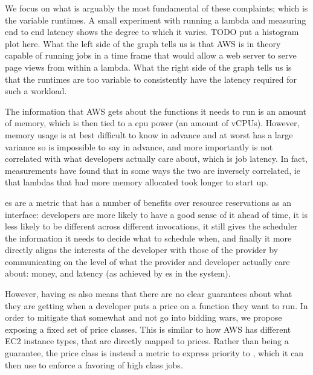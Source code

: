 We focus on what is arguably the most fundamental of these complaints; which is
the variable runtimes. A small experiment with running a lambda and measuring
end to end latency shows the degree to which it varies. TODO put a histogram
plot here. What the left side of
the graph tells us is that AWS is in theory capable of running jobs in a time
frame that would allow a web server to serve page views from within a lambda.
What the right side of the graph tells us is that the runtimes are too variable
to consistently have the latency required for such a workload.

The information that AWS gets about the functions it needs to run is an amount
of memory, which is then tied to a cpu power (an amount of vCPUs). However,
memory usage is at best difficult to know in advance and at worst has a large
variance so is impossible to say in advance, and more importantly is not
correlated with what developers actually care about, which is job latency. In
fact, measurements have found that in some ways the two are inversely
correlated, ie that lambdas that had more memory allocated took longer to start
up. 

\Priceclass{}es are a metric that has a number of benefits over resource
reservations as an interface: developers are more likely to have a good sense of
it ahead of time, it is less likely to be different across different
invocations, it still gives the scheduler the information it needs to decide
what to schedule when, and finally it more directly aligns the interests of the
developer with those of the provider by communicating on the level of what the
provider and developer actually care about: money, and latency (as achieved by
\class{}es in the system).


However, having \priceclass{}es also means that there are no clear guarantees
about what they are getting when a developer puts a price on a function they
want to run. In order to mitigate that somewhat and not go into bidding wars, we
propose exposing a fixed set of price classes. This is similar to how AWS has
different EC2 instance types, that are directly mapped to prices. Rather than
being a guarantee, the price class is instead a metric to express priority to
\sys{}, which it can then use to enforce a favoring of high class jobs.